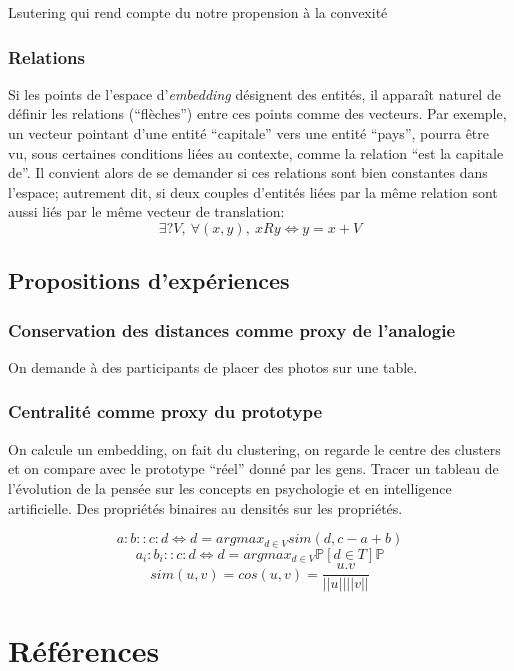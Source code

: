 \documentclass[french]{article}
\begin{document}
				Lsutering qui rend compte du notre propension à la convexité
			\subsubsection{Relations}
				Si les points de l'espace d'\textit{embedding} désignent des entités, il apparaît naturel de définir les relations (``flèches'') entre ces points comme des vecteurs. Par exemple, un vecteur pointant d'une entité ``capitale'' vers une entité ``pays'', pourra être vu, sous certaines conditions liées au contexte, comme la relation ``est la capitale de''. Il convient alors de se demander si ces relations sont bien constantes dans l'espace; autrement dit, si deux couples d'entités liées par la même relation sont aussi liés par le même vecteur de translation:
				\begin{equation}
				\exists?V, \ \forall (x, y), \ xRy \iff  y = x+V
				\end{equation}
		\subsection{Propositions d'expériences}
			\subsubsection{Conservation des distances comme proxy de l'analogie}
				On demande à des participants de placer des photos sur une table.
			\subsubsection{Centralité comme proxy du prototype}
				On calcule un embedding, on fait du clustering, on regarde le centre des clusters et on compare avec le prototype ``réel'' donné par les gens.
				Tracer un tableau de l'évolution de la pensée sur les concepts en psychologie et en intelligence artificielle. Des propriétés binaires au densités sur les propriétés.

		\begin{equation}
		a:b::c:d \iff d = argmax_{d\in V}sim(d, c-a+b)
		\end{equation}
		\begin{equation}
		a_i:b_i::c:d \iff d = argmax_{d \in V}\mathds{P}[d \in T]\mathds{P}
		\end{equation}
		\begin{equation}
		sim(u, v) = cos(u, v) = \frac{u.v}{||u|| ||v||}
		\end{equation}
		\nocite{*}
	\newpage
	\section*{Références}
	\printbibliography[heading=main, keyword=main]
	\printbibliography[heading=minor, keyword=minor]
\end{document}
